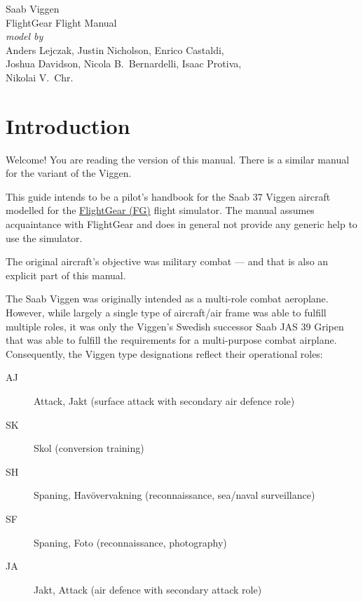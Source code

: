 
\usepackage[english]{babel}
\usepackage[utf8]{inputenc}
\usepackage[T1]{fontenc}
\usepackage{menukeys}
\usepackage{graphicx}
\usepackage{hyperref}
\usepackage{wallpaper}
\usepackage{xcolor}
\usepackage{geometry}
\usepackage{pdflscape}
\usepackage{gensymb}

\pagestyle{headings}


\begin{titlepage}
  \centering
  \sf
  {\Huge Saab  Viggen}
  \\[1cm]
  {\Huge FlightGear Flight Manual}
  \\[16cm]
  \color{white}
  \emph{model by}\\
  Anders Lejczak, Justin Nicholson, Enrico Castaldi,\\
  Joshua Davidson, Nicola B.\ Bernardelli, Isaac Protiva,\\
  Nikolai V.\ Chr.
\end{titlepage}
\restoregeometry

\tableofcontents

\chapter{Introduction}

Welcome! You are reading the  version of this manual. There is a similar manual for the  variant of the Viggen.

This guide intends to be a pilot's handbook for the Saab 37 Viggen aircraft modelled for the \href{http://www.flightgear.org}{FlightGear (FG)} flight simulator. The manual assumes acquaintance with FlightGear and does in general not provide any generic help to use the simulator.

The original aircraft's objective was military combat --- and that is also an explicit part of this manual.

The Saab Viggen was originally intended as a multi-role combat aeroplane. However, while largely a single type of aircraft/air frame was able to fulfill multiple roles, it was only the Viggen's Swedish successor Saab JAS 39 Gripen that was able to fulfill the requirements for a multi-purpose combat airplane. Consequently, the Viggen type designations reflect their operational roles:
\begin{description}
\item[AJ] Attack, Jakt (surface attack with secondary air defence role)
\item[SK] Skol (conversion training)
\item[SH] Spaning, Havövervakning (reconnaissance, sea/naval surveillance)
\item[SF] Spaning, Foto (reconnaissance, photography)
\item[JA] Jakt, Attack (air defence with secondary attack role)
\end{description}

